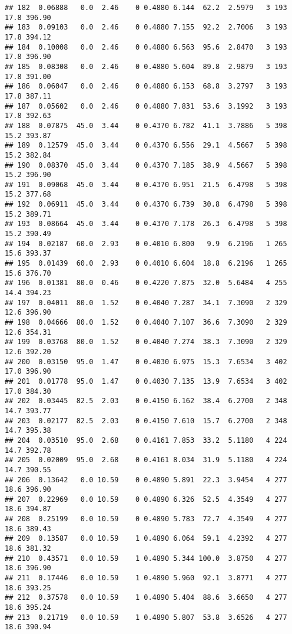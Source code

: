 \documentclass[
]{article}
\begin{document}
\begin{verbatim}
## 182  0.06888   0.0  2.46    0 0.4880 6.144  62.2  2.5979   3 193    17.8 396.90
## 183  0.09103   0.0  2.46    0 0.4880 7.155  92.2  2.7006   3 193    17.8 394.12
## 184  0.10008   0.0  2.46    0 0.4880 6.563  95.6  2.8470   3 193    17.8 396.90
## 185  0.08308   0.0  2.46    0 0.4880 5.604  89.8  2.9879   3 193    17.8 391.00
## 186  0.06047   0.0  2.46    0 0.4880 6.153  68.8  3.2797   3 193    17.8 387.11
## 187  0.05602   0.0  2.46    0 0.4880 7.831  53.6  3.1992   3 193    17.8 392.63
## 188  0.07875  45.0  3.44    0 0.4370 6.782  41.1  3.7886   5 398    15.2 393.87
## 189  0.12579  45.0  3.44    0 0.4370 6.556  29.1  4.5667   5 398    15.2 382.84
## 190  0.08370  45.0  3.44    0 0.4370 7.185  38.9  4.5667   5 398    15.2 396.90
## 191  0.09068  45.0  3.44    0 0.4370 6.951  21.5  6.4798   5 398    15.2 377.68
## 192  0.06911  45.0  3.44    0 0.4370 6.739  30.8  6.4798   5 398    15.2 389.71
## 193  0.08664  45.0  3.44    0 0.4370 7.178  26.3  6.4798   5 398    15.2 390.49
## 194  0.02187  60.0  2.93    0 0.4010 6.800   9.9  6.2196   1 265    15.6 393.37
## 195  0.01439  60.0  2.93    0 0.4010 6.604  18.8  6.2196   1 265    15.6 376.70
## 196  0.01381  80.0  0.46    0 0.4220 7.875  32.0  5.6484   4 255    14.4 394.23
## 197  0.04011  80.0  1.52    0 0.4040 7.287  34.1  7.3090   2 329    12.6 396.90
## 198  0.04666  80.0  1.52    0 0.4040 7.107  36.6  7.3090   2 329    12.6 354.31
## 199  0.03768  80.0  1.52    0 0.4040 7.274  38.3  7.3090   2 329    12.6 392.20
## 200  0.03150  95.0  1.47    0 0.4030 6.975  15.3  7.6534   3 402    17.0 396.90
## 201  0.01778  95.0  1.47    0 0.4030 7.135  13.9  7.6534   3 402    17.0 384.30
## 202  0.03445  82.5  2.03    0 0.4150 6.162  38.4  6.2700   2 348    14.7 393.77
## 203  0.02177  82.5  2.03    0 0.4150 7.610  15.7  6.2700   2 348    14.7 395.38
## 204  0.03510  95.0  2.68    0 0.4161 7.853  33.2  5.1180   4 224    14.7 392.78
## 205  0.02009  95.0  2.68    0 0.4161 8.034  31.9  5.1180   4 224    14.7 390.55
## 206  0.13642   0.0 10.59    0 0.4890 5.891  22.3  3.9454   4 277    18.6 396.90
## 207  0.22969   0.0 10.59    0 0.4890 6.326  52.5  4.3549   4 277    18.6 394.87
## 208  0.25199   0.0 10.59    0 0.4890 5.783  72.7  4.3549   4 277    18.6 389.43
## 209  0.13587   0.0 10.59    1 0.4890 6.064  59.1  4.2392   4 277    18.6 381.32
## 210  0.43571   0.0 10.59    1 0.4890 5.344 100.0  3.8750   4 277    18.6 396.90
## 211  0.17446   0.0 10.59    1 0.4890 5.960  92.1  3.8771   4 277    18.6 393.25
## 212  0.37578   0.0 10.59    1 0.4890 5.404  88.6  3.6650   4 277    18.6 395.24
## 213  0.21719   0.0 10.59    1 0.4890 5.807  53.8  3.6526   4 277    18.6 390.94

\end{verbatim}
\end{document}
